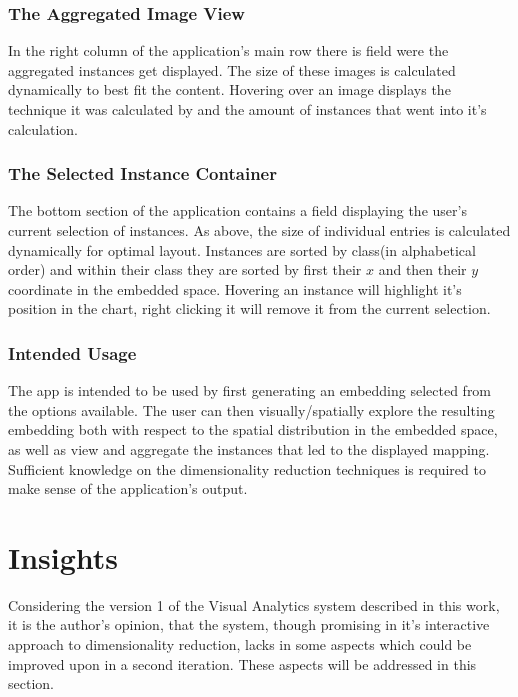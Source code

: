 \documentclass[11pt,a4paper]{article}
\begin{document}
    \subsubsection*{The Aggregated Image View}
        In the right column of the application's main row there is field were the aggregated instances get displayed. The size of these images is calculated dynamically to best fit the content. Hovering over an image displays the technique it was calculated by and the amount of instances that went into it's calculation. 
    \subsubsection*{The Selected Instance Container}
        The bottom section of the application contains a field displaying the user's current selection of instances. As above, the size of individual entries is calculated dynamically for optimal layout. Instances are sorted by class(in alphabetical order) and within their class they are sorted by first their $x$ and then their $y$ coordinate in the embedded space. Hovering an instance will highlight it's position in the chart, right clicking it will remove it from the current selection.
    \subsubsection*{Intended Usage}
        The app is intended to be used by first generating an embedding selected from the options available. The user can then visually/spatially explore the resulting embedding both with respect to the spatial distribution in the embedded space, as well as view and aggregate the instances that led to the displayed mapping. Sufficient knowledge on the dimensionality reduction techniques is required to make sense of the application's output.
  \section{Insights}
    Considering the version 1 of the Visual Analytics system described in this work, it is the author's opinion, that the system, though promising in it's interactive approach to dimensionality reduction, lacks in some aspects  which could be improved upon in a second iteration. These aspects will be addressed in this section.
\end{document}
